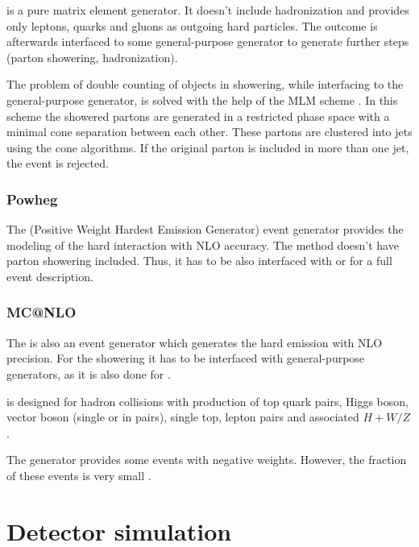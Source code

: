 \MG is a pure matrix element generator. It doesn't include hadronization and provides only leptons, quarks and gluons as outgoing hard particles. 
The outcome is afterwards interfaced to some general-purpose generator to generate further steps (parton showering, hadronization). 

The problem of double counting of objects in showering, while interfacing \MG to the general-purpose generator, is solved with the help of the 
MLM scheme \cite{Mrenna:2003if}. In this scheme the showered partons are generated in a restricted phase space with a minimal cone separation
between each other. These partons are clustered into jets using the cone algorithms. If the original parton is included in more than one jet,
the event is rejected.

\subsubsection{Powheg}

The \Powheg (Positive Weight Hardest Emission Generator) event generator \cite{Frixione:2007vw} provides the modeling of the hard interaction 
with NLO accuracy. The \Powheg method doesn't have parton showering included. Thus, it has to be also interfaced with \PYTHIA or
\HERWIG for a full event description.

\subsubsection{MC@NLO}

The \MCNLO \cite{Frixione:2002ik} is also an event generator which generates the hard emission with NLO precision. For the showering
it has to be interfaced with general-purpose generators, as it is also done for \Powheg. 

\MCNLO is designed for hadron collisions with production of top quark pairs, Higgs boson, vector boson (single or in pairs), single top,
lepton pairs and associated $H+W/Z$.

The \MCNLO generator provides some events with negative weights. However, the fraction of these events is very small \cite{Frixione:2002ik}.


\section{Detector simulation}


